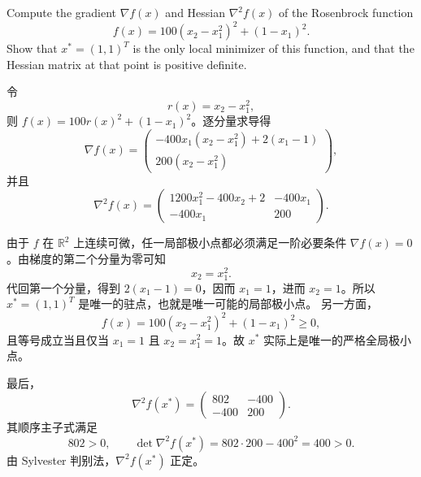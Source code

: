 \documentclass{ctexart}
\newif\ifpreface
\begin{document}
\large
\setlength{\baselineskip}{1.2em}
\ifpreface
    
\newgeometry{left=2cm,right=2cm,top=2cm,bottom=2cm}
\else
{}
\maketitle
\fi

\begin{problem}[2.1]
Compute the gradient $\nabla f(x)$ and Hessian $\nabla^2 f(x)$ of the Rosenbrock function
\[
    f(x) = 100(x_2-x_1^2)^2+(1-x_1)^2.
\]
Show that $x^*=(1,1)^T$ is the only local minimizer of this function, and that the Hessian matrix at that point is positive definite.
\end{problem}

\begin{solution}
令
\[
    r(x)=x_2-x_1^2,
\]
则 $f(x)=100r(x)^2+(1-x_1)^2$。逐分量求导得
\[
    \nabla f(x)=
    \begin{pmatrix}
        -400x_1(x_2-x_1^2)+2(x_1-1)\\
        200(x_2-x_1^2)
    \end{pmatrix},
\]
并且
\[
    \nabla^2 f(x)=
    \begin{pmatrix}
        1200x_1^2-400x_2+2 & -400x_1\\
        -400x_1 & 200
    \end{pmatrix}.
\]

由于 $f$ 在 $\mathbb R^2$ 上连续可微，任一局部极小点都必须满足一阶必要条件
$\nabla f(x)=0$。由梯度的第二个分量为零可知
\[
    x_2=x_1^2.
\]
代回第一个分量，得到 $2(x_1-1)=0$，因而 $x_1=1$，进而
$x_2=1$。所以 $x^*=(1,1)^T$ 是唯一的驻点，也就是唯一可能的局部极小点。
另一方面，
\[
    f(x)=100(x_2-x_1^2)^2+(1-x_1)^2\geq 0,
\]
且等号成立当且仅当 $x_1=1$ 且 $x_2=x_1^2=1$。故 $x^*$ 实际上是唯一的严格全局极小点。

最后，
\[
    \nabla^2f(x^*)=
    \begin{pmatrix}802&-400\\-400&200\end{pmatrix}.
\]
其顺序主子式满足
\[
    802>0,
    \qquad
    \det\nabla^2f(x^*)=802\cdot200-400^2=400>0.
\]
由 Sylvester 判别法，$\nabla^2f(x^*)$ 正定。
\end{solution}
\end{document}
